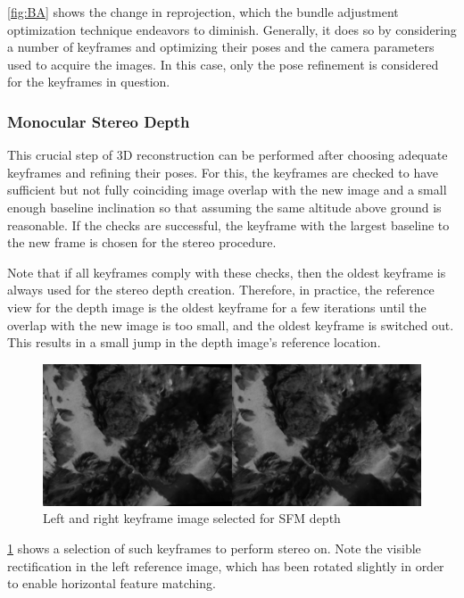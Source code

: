 \cref{fig:BA} shows the change in reprojection, which the bundle adjustment optimization technique endeavors to diminish. Generally, it does so by considering a number of keyframes and optimizing their poses and the camera parameters used to acquire the images. In this case, only the pose refinement is considered for the keyframes in question.
\subsubsection{Monocular Stereo Depth}\label{subsubsec:SFM_stereo}

This crucial step of 3D reconstruction can be performed after choosing adequate keyframes and refining their poses. For this, the keyframes are checked to have sufficient but not fully coinciding image overlap with the new image and a small enough baseline inclination so that assuming the same altitude above ground is reasonable. If the checks are successful, the keyframe with the largest baseline to the new frame is chosen for the stereo procedure. 

Note that if all keyframes comply with these checks, then the oldest keyframe is always used for the stereo depth creation. Therefore, in practice, the reference view for the depth image is the oldest keyframe for a few iterations until the overlap with the new image is too small, and the oldest keyframe is switched out. This results in a small jump in the depth image's reference location. 

\begin{figure}[h]
\centering
\includegraphics[scale=0.28]{images/system_overview/sfm_images.png}
\caption{Left and right keyframe image selected for SFM depth}
\label{fig:sfm_images}
\end{figure}

\cref{fig:sfm_images} shows a selection of such keyframes to perform stereo on. Note the visible rectification in the left reference image, which has been rotated slightly in order to enable horizontal feature matching.

